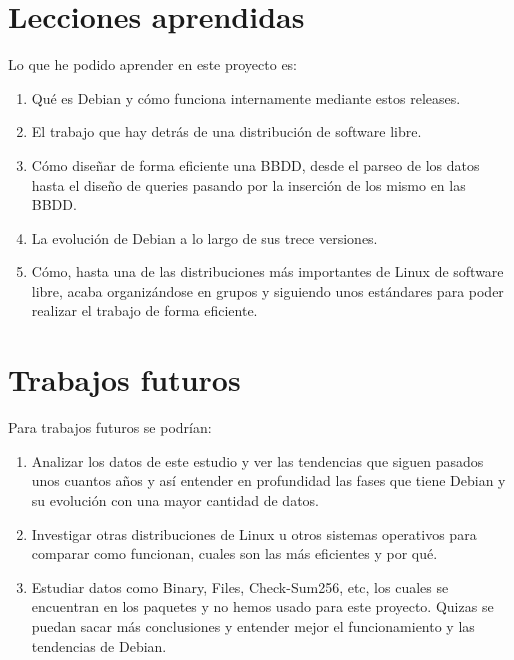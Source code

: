 \documentclass[a4paper, 12pt]{book}
\begin{document}
\section{Lecciones aprendidas}
\label{sec:lecciones_aprendidas}

Lo que he podido aprender en este proyecto es:

\begin{enumerate}
  \item Qué es Debian y cómo funciona internamente mediante estos releases.
  \item El trabajo que hay detrás de una distribución de software libre.
  \item Cómo diseñar de forma eficiente una BBDD, desde el parseo de los datos hasta el diseño de queries pasando por la inserción de los mismo en las BBDD.
  \item La evolución de Debian a lo largo de sus trece versiones.
  \item Cómo, hasta una de las distribuciones más importantes de Linux de software libre, acaba organizándose en grupos y siguiendo unos estándares para poder realizar el trabajo de forma eficiente.
\end{enumerate}


\section{Trabajos futuros}
\label{sec:trabajos_futuros}

Para trabajos futuros se podrían:

\begin{enumerate}
	\item Analizar los datos de este estudio y ver las tendencias que siguen pasados unos cuantos años y así entender en profundidad las fases que tiene Debian y su evolución con una mayor cantidad de datos.
	
	\item Investigar otras distribuciones de Linux u otros sistemas operativos para comparar como funcionan, cuales son las más eficientes y por qué.
	
	\item Estudiar datos como Binary, Files, Check-Sum256, etc, los cuales se encuentran en los paquetes y no hemos usado para este proyecto. Quizas se puedan sacar más conclusiones y entender mejor el funcionamiento y las tendencias de Debian.
\end{enumerate}
\end{document}
